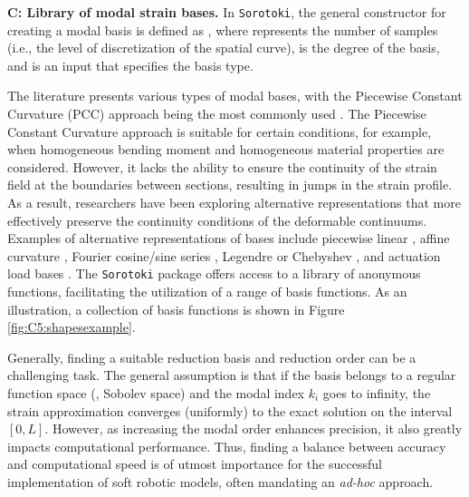 \textbf{C: Library of modal strain bases.} In \texttt{Sorotoki}, the general constructor for creating a modal basis is defined as , where  represents the number of samples (i.e., the level of discretization of the spatial curve),  is the degree of the basis, and  is an input that specifies the basis type.

The literature presents various types of modal bases, with the Piecewise Constant Curvature (PCC) approach being the most commonly used \cite{Falkenhahn2015,DellaSantina2020a}. The Piecewise Constant Curvature approach is suitable for certain conditions, for example, when homogeneous bending moment and homogeneous material properties are considered. However, it lacks the ability to ensure the continuity of the strain field at the boundaries between sections, resulting in jumps in the strain profile. As a result, researchers have been exploring alternative representations that more effectively preserve the continuity conditions of the deformable continuums. Examples of alternative representations of bases include piecewise linear \cite{Li2023Jan}, affine curvature \cite{DellaSantina2020Dec,Stella2022Nov}, Fourier cosine/sine series \cite{Chirikjian1994Jun,Chirikjian1992}, Legendre or Chebyshev \cite{Boyer2021,Caasenbrood2021}, and actuation load bases \cite{Renda2020}. The \texttt{Sorotoki} package offers access to a library of anonymous functions, facilitating the utilization of a range of basis functions. As an illustration, a collection of basis functions is shown in Figure \ref{fig:C5:shapesexample}.\\

\begin{rmk}
Generally, finding a suitable reduction basis and reduction order can be a challenging task. The general assumption is that if the basis belongs to a regular function space (\ie, Sobolev space) and the modal index $k_i$ goes to infinity, the strain approximation converges (uniformly) to the exact solution on the interval $[0,L]$. However, as increasing the modal order enhances precision, it also greatly impacts computational performance. Thus, finding a balance between accuracy and computational speed is of utmost importance for the successful implementation of soft robotic models, often mandating an \textit{ad-hoc} approach.
\end{rmk} 


